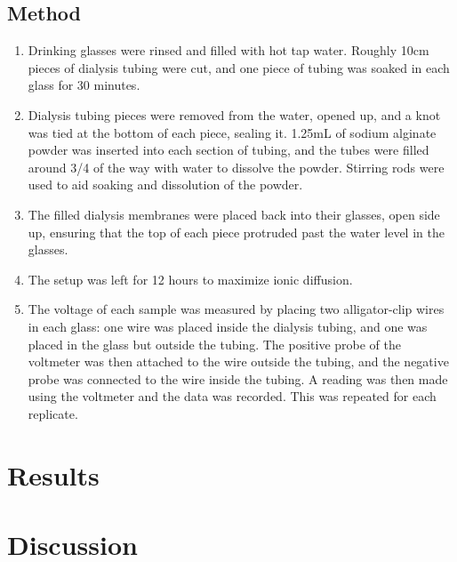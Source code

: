 \documentclass[letterpaper]{article}
\begin{document}
\subsection*{Method}

\begin{enumerate}
	\item Drinking glasses were rinsed and filled with hot tap water. Roughly 10cm pieces of dialysis tubing were cut, and one piece of tubing was soaked in each glass for 30 minutes.
	\item Dialysis tubing pieces were removed from the water, opened up, and a knot was tied at the bottom of each piece, sealing it. 1.25mL of sodium alginate powder was inserted into each section of tubing, and the tubes were filled around 3/4 of the way with water to dissolve the powder. Stirring rods were used to aid soaking and dissolution of the powder.
	\item The filled dialysis membranes were placed back into their glasses, open side up, ensuring that the top of each piece protruded past the water level in the glasses.
	\item The setup was left for 12 hours to maximize ionic diffusion.
	\item The voltage of each sample was measured by placing two alligator-clip wires in each glass: one wire was placed inside the dialysis tubing, and one was placed in the glass but outside the tubing. The positive probe of the voltmeter was then attached to the wire outside the tubing, and the negative probe was connected to the wire inside the tubing. A reading was then made using the voltmeter and the data was recorded. This was repeated for each replicate.
\end{enumerate}

\section{Results}
\label{sec:results}



\section{Discussion}
\label{sec:discussion}



\printbibliography[heading=bibintoc]
\end{document}
